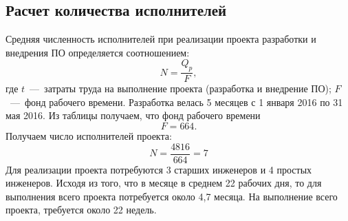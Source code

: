 
    \subsection{Расчет количества исполнителей}
    \label{subsec:slaves}
        Средняя численность исполнителей при реализации проекта разработки и внедрения ПО определяется соотношением:
        $$N=\dfrac {Q_p} {F},$$
        где $t$~---~затраты труда на выполнение проекта (разработка и внедрение ПО); $F$~---~фонд рабочего времени.
        Разработка велась 5 месяцев с 1 января 2016 по 31 мая 2016.
        Из таблицы получаем, что фонд рабочего времени $$F=664.$$
        Получаем число исполнителей проекта:
        $$N=\dfrac{4816}{664}=7$$
        Для реализации проекта потребуются 3 старших инженеров и 4 простых инженеров.
        Исходя из того, что в месяце в среднем 22 рабочих дня, то для выполнения
        всего проекта потребуется около 4,7 месяца. На выполнение всего проекта,
        требуется около 22 недель.
